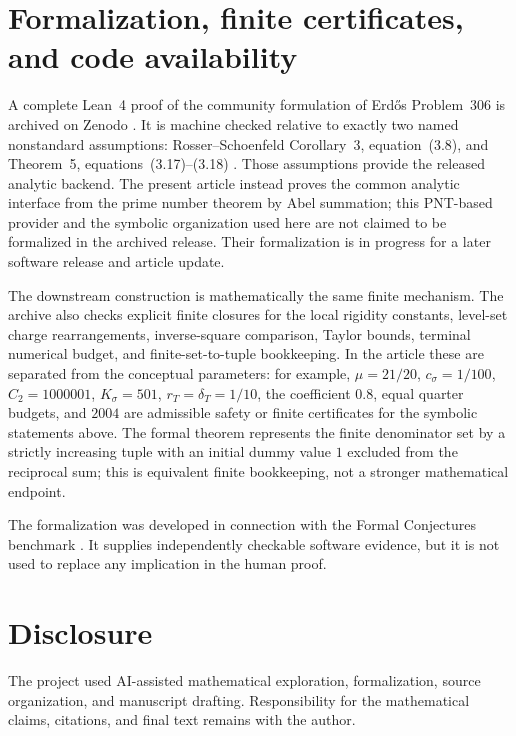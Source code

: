 \section*{Formalization, finite certificates, and code availability}

A complete Lean~4 proof of the community formulation of Erd\H{o}s Problem~306
is archived on Zenodo \cite{TangErdos306}.  It is machine checked relative to
exactly two named nonstandard assumptions: Rosser--Schoenfeld Corollary~3,
equation~(3.8), and Theorem~5, equations~(3.17)--(3.18)
\cite{RosserSchoenfeld1962}.  Those assumptions provide the released analytic
backend.  The present article instead proves the common analytic interface from
the prime number theorem by Abel summation; this PNT-based provider and the
symbolic organization used here are not claimed to be formalized in the
archived release.  Their formalization is in progress for a later software
release and article update.

The downstream construction is mathematically the same finite mechanism.  The
archive also checks explicit finite closures for the local rigidity constants,
level-set charge rearrangements, inverse-square comparison, Taylor bounds,
terminal numerical budget, and finite-set-to-tuple bookkeeping.  In the article
these are separated from the conceptual parameters: for example,
$\mu=21/20$, $c_\sigma=1/100$, $C_2=1000001$, $K_\sigma=501$,
$r_T=\delta_T=1/10$, the coefficient $0.8$, equal quarter budgets, and $2004$
are admissible safety or finite certificates for the symbolic statements above.
The formal theorem represents the finite denominator set by a strictly
increasing tuple with an initial dummy value $1$ excluded from the reciprocal
sum; this is equivalent finite bookkeeping, not a stronger mathematical
endpoint.

The formalization was developed in connection with the Formal Conjectures
benchmark \cite{FormalConjectures2026}.  It supplies independently checkable
software evidence, but it is not used to replace any implication in the human
proof.

\section*{Disclosure}

The project used AI-assisted mathematical exploration, formalization, source
organization, and manuscript drafting.  Responsibility for the mathematical
claims, citations, and final text remains with the author.
